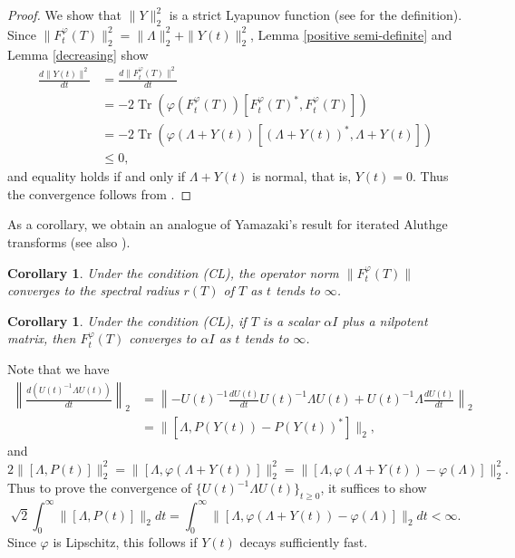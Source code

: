 \documentclass[12pt]{article}
\newtheorem{cor}[theorem]{Corollary}
\theoremstyle{definition}
\numberwithin{equation}{section}
\DeclareMathOperator{\Tr}{Tr}
\begin{document}
\begin{proof} We show that $\|Y\|_2^2$ is a strict Lyapunov function (see \cite[page 201]{Te2012} for the definition). 
Since $\|F^\varphi_t(T)\|_2^2=\|\Lambda\|_2^2+\|Y(t)\|_2^2$, Lemma \ref{positive semi-definite} and 
Lemma \ref{decreasing} show 
\begin{align}\label{Lyapunov}
\frac{d\|Y(t)\|^2}{dt}&=\frac{d\|F^\varphi_t(T)\|^2}{dt} \\ \nonumber
 &= -2\Tr(\varphi(F^\varphi_t(T))[F^\varphi_t(T)^*,F^\varphi_t(T)])\\ \nonumber
 &=-2\Tr(\varphi(\Lambda+Y(t))[(\Lambda+Y(t))^*,\Lambda+Y(t)])\\ \nonumber
 &\leq 0,
\end{align}
and equality holds if and only if $\Lambda+Y(t)$ is normal, that is, $Y(t)=0$. 
Thus the convergence follows from \cite[Theorem 6.13, 6.14]{Te2012}.  
\end{proof}

As a corollary, we obtain an analogue of Yamazaki's result \cite[Theorem 1]{Y2002} for iterated  Aluthge transforms (see also \cite{Ta2008}). 

\begin{cor}\label{numerical} Under the condition (CL), the operator norm $\|F^\varphi_t(T)\|$ converges to the spectral 
radius $r(T)$ of $T$ as $t$ tends to $\infty$. 

\end{cor}

\begin{cor}\label{sca+nil} Under the condition (CL), if $T$ is a scalar $\alpha I$ plus a nilpotent matrix, then  
$F^\varphi_t(T)$ converges to $\alpha I$ as $t$ tends to $\infty$.  
\end{cor}


Note that we have 
\begin{align*}
\left\|\frac{d(U(t)^{-1}\Lambda U(t))}{dt}\right\|_2
 &=\left\| -U(t)^{-1}\frac{dU(t)}{dt}U(t)^{-1}\Lambda U(t)+U(t)^{-1}\Lambda \frac{dU(t)}{dt}\right\|_2 \\
 &=\|[\Lambda,P(Y(t))-P(Y(t))^*]\|_2, 
\end{align*}
and 
\[2\|[\Lambda,P(t)]\|_2^2= \|[\Lambda,\varphi(\Lambda+Y(t))]\|_2^2
=\|[\Lambda, \varphi(\Lambda+Y(t))-\varphi(\Lambda)]\|_2^2.\]
Thus to prove the convergence of $\{U(t)^{-1}\Lambda U(t)\}_{t\geq 0}$, it suffices to show 
\begin{equation}\label{finitelength}
\sqrt{2}\int_0^\infty  \|[\Lambda,P(t)]\|_2dt
=\int_0^\infty \|[\Lambda, \varphi(\Lambda+Y(t))-\varphi(\Lambda)]\|_2dt<\infty. 
\end{equation}
Since $\varphi$ is Lipschitz, this follows if $Y(t)$ decays sufficiently fast.  
\end{document}
